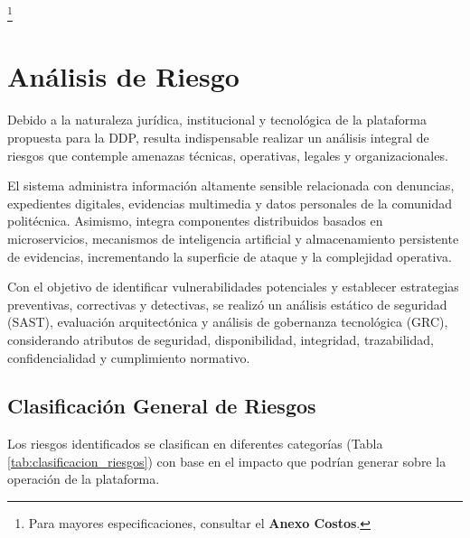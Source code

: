 \footnote{Para mayores especificaciones, consultar el \textbf{Anexo Costos}.}


\section{Análisis de Riesgo}

Debido a la naturaleza jurídica, institucional y tecnológica de la plataforma propuesta para la DDP, resulta indispensable realizar un análisis integral de riesgos que contemple amenazas técnicas, operativas, legales y organizacionales.

El sistema administra información altamente sensible relacionada con denuncias, expedientes digitales, evidencias multimedia y datos personales de la comunidad politécnica. Asimismo, integra componentes distribuidos basados en microservicios, mecanismos de inteligencia artificial y almacenamiento persistente de evidencias, incrementando la superficie de ataque y la complejidad operativa.

Con el objetivo de identificar vulnerabilidades potenciales y establecer estrategias preventivas, correctivas y detectivas, se realizó un análisis estático de seguridad (SAST), evaluación arquitectónica y análisis de gobernanza tecnológica (GRC), considerando atributos de seguridad, disponibilidad, integridad, trazabilidad, confidencialidad y cumplimiento normativo.

\subsection{Clasificación General de Riesgos}

Los riesgos identificados se clasifican en diferentes categorías (Tabla \ref{tab:clasificacion_riesgos}) con base en el impacto que podrían generar sobre la operación de la plataforma.

